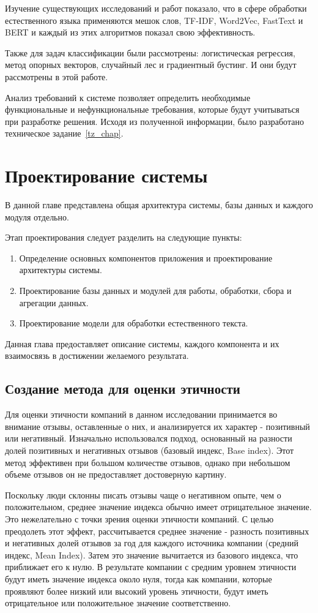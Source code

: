 \documentclass[PI, VKR]{HSEUniversity}
\begin{document}
Изучение существующих исследований и работ показало, что в сфере обработки естественного языка применяются мешок слов, TF-IDF, Word2Vec, FastText и BERT и каждый из этих алгоритмов показал свою эффективность.

Также для задач классификации были рассмотрены: логистическая регрессия, метод опорных векторов, случайный лес и градиентный бустинг. И они будут рассмотрены в этой работе.

Анализ требований к системе позволяет определить необходимые функциональные и нефункциональные требования, которые будут учитываться при разработке решения. Исходя из полученной информации, было разработано техническое задание~\ref{tz_chap}.
\chapter{Проектирование системы}
\label{sec:org6ace4b2}
В данной главе представлена общая архитектура системы, базы данных и каждого модуля отдельно.

Этап проектирования следует разделить на следующие пункты:
\begin{enumerate}
\item Определение основных компонентов приложения и проектирование архитектуры системы.
\item Проектирование базы данных и модулей для работы, обработки, сбора и агрегации данных.
\item Проектирование модели для обработки естественного текста.
\end{enumerate}

Данная глава предоставляет описание системы, каждого компонента и их взаимосвязь в достижении желаемого результата.
\section{Создание метода для оценки этичности}
\label{sec:orgf15aaa5}
Для оценки этичности компаний в данном исследовании принимается во внимание отзывы, оставленные о них, и анализируется их характер - позитивный или негативный. Изначально использовался подход, основанный на разности долей позитивных и негативных отзывов (базовый индекс, Base index). Этот метод эффективен при большом количестве отзывов, однако при небольшом объеме отзывов он не предоставляет достоверную картину.

Поскольку люди склонны писать отзывы чаще о негативном опыте, чем о положительном, среднее значение индекса обычно имеет отрицательное значение. Это нежелательно с точки зрения оценки этичности компаний. С целью преодолеть этот эффект, рассчитывается среднее значение - разность позитивных и негативных долей отзывов за год для каждого источника компании (средний индекс, Mean Index). Затем это значение вычитается из базового индекса, что приближает его к нулю. В результате компании с средним уровнем этичности будут иметь значение индекса около нуля, тогда как компании, которые проявляют более низкий или высокий уровень этичности, будут иметь отрицательное или положительное значение соответственно.
\end{document}
